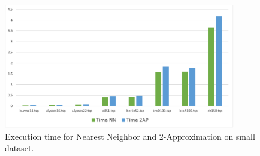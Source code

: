 \begin{figure}[H]
    \centering
    \includegraphics[width=0.9\textwidth]{./img/time_nn_2ap_small.png}
    \caption{Execution time for Nearest Neighbor and 2-Approximation on small dataset.}
    \label{fig:time_nn_2ap_small}
\end{figure}
